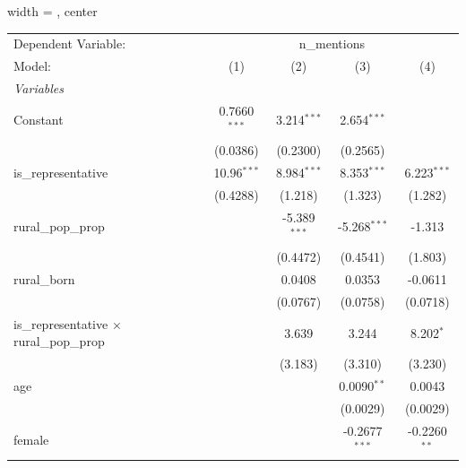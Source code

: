 
\begingroup
\centering
\begin{adjustbox}{width = \textwidth, center}
   \begin{tabular}{lcccc}
      \tabularnewline \midrule \midrule
      Dependent Variable: & \multicolumn{4}{c}{n\_mentions}\\
      Model:                                           & (1)            & (2)            & (3)             & (4)\\  
      \midrule
      \emph{Variables}\\
      Constant                                         & 0.7660$^{***}$ & 3.214$^{***}$  & 2.654$^{***}$   &   \\   
                                                       & (0.0386)       & (0.2300)       & (0.2565)        &   \\   
      is\_representative                               & 10.96$^{***}$  & 8.984$^{***}$  & 8.353$^{***}$   & 6.223$^{***}$\\   
                                                       & (0.4288)       & (1.218)        & (1.323)         & (1.282)\\   
      rural\_pop\_prop                                 &                & -5.389$^{***}$ & -5.268$^{***}$  & -1.313\\   
                                                       &                & (0.4472)       & (0.4541)        & (1.803)\\   
      rural\_born                                      &                & 0.0408         & 0.0353          & -0.0611\\   
                                                       &                & (0.0767)       & (0.0758)        & (0.0718)\\   
      is\_representative $\times$ rural\_pop\_prop     &                & 3.639          & 3.244           & 8.202$^{*}$\\   
                                                       &                & (3.183)        & (3.310)         & (3.230)\\   
      age                                              &                &                & 0.0090$^{**}$   & 0.0043\\   
                                                       &                &                & (0.0029)        & (0.0029)\\   
      female                                           &                &                & -0.2677$^{***}$ & -0.2260$^{**}$\\   

\end{tabular}
\end{adjustbox}
